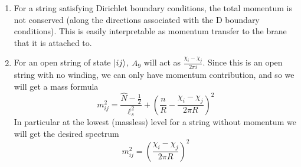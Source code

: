 \documentclass[11pt, class=article, crop=false]{standalone}
\begin{document}
\begin{enumerate}
	
	\item For a string satisfying Dirichlet boundary conditions, the total momentum is not conserved (along the directions associated with the D boundary conditions). This is easily interpretable as momentum transfer to the brane that it is attached to.
	
	\item For an open string of state $\ket{ij}$, $A_9$ will act as $\frac{\chi_i - \chi_j}{2\pi i}$. Since this is an open string with no winding, we can only have momentum contribution, and so we will get a mass formula
	\[
		m^2_{ij} = \frac{\hat N - \frac12}{\ell_s^2} + \left(\frac{n}{R} - \frac{\chi_i - \chi_j}{2\pi R} \right)^2
	\]
	In particular at the lowest (massless) level for a string without momentum we will get the desired spectrum
	\[
		m_{ij}^2 =  \left(\frac{\chi_i - \chi_j}{2\pi R} \right)^2
	\]
	

\end{enumerate}
\end{document}
